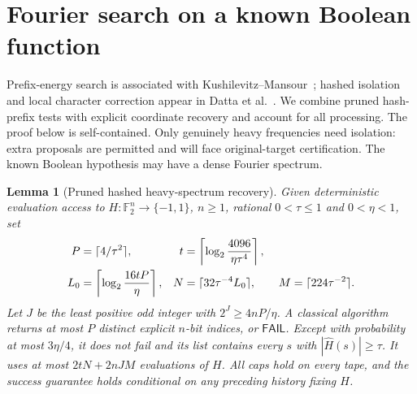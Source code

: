 \documentclass[11pt]{article}
\newtheorem{lemma}[theorem]{Lemma}
\theoremstyle{remark}\newtheorem{remark}[theorem]{Remark}
\newcommand{\F}{\mathbb F}
\newcommand{\FAIL}{\mathsf{FAIL}}
\begin{document}
\section{Fourier search on a known Boolean function}
Prefix-energy search is associated with Kushilevitz--Mansour~\cite{KM}; hashed isolation and local character correction appear in Datta et al.~\cite[Lemma~8 and Claims~12--15]{Datta}. We combine pruned hash-prefix tests with explicit coordinate recovery and account for all processing. The proof below is self-contained. Only genuinely heavy frequencies need isolation: extra proposals are permitted and will face original-target certification. The known Boolean hypothesis may have a dense Fourier spectrum.

\begin{lemma}[Pruned hashed heavy-spectrum recovery]\label{lem:search}
Given deterministic evaluation access to $H:\F_2^n\to\{-1,1\}$, $n\ge1$, rational $0<\tau\le1$ and $0<\eta<1$, set
\begin{align}\label{eq:hashparameters}
 P&=\lceil4/\tau^2\rceil,&
 t&=\left\lceil\log_2\frac{4096}{\eta\tau^4}\right\rceil,\notag\\
 L_0&=\left\lceil\log_2\frac{16tP}{\eta}\right\rceil,&
 N&=\lceil32\tau^{-4}L_0\rceil,\qquad M=\lceil224\tau^{-2}\rceil.
\end{align}
Let $J$ be the least positive odd integer with $2^J\ge4nP/\eta$.
A classical algorithm returns at most $P$ distinct explicit $n$-bit indices, or $\FAIL$. Except with probability at most $3\eta/4$, it does not fail and its list contains every $s$ with $|\widehat H(s)|\ge\tau$. It uses at most $2tN+2nJM$ evaluations of $H$. All caps hold on every tape, and the success guarantee holds conditional on any preceding history fixing $H$.
\end{lemma}
\end{document}
